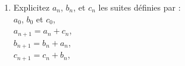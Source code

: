 \documentclass[a4paper,11pt]{book}
\begin{document}
\begin{enumerate}
De m\^eme :\\
$b_n=\frac{1}{3}(2^n(a_0+b_0+c_0)+(-1)^n(2b_0-c_0-a_0)$\\ 
$c_n=\frac{1}{3}(2^n(a_0+b_0+c_0)+(-1)^n(2c_0-b_0-a_0)$\\ 
On v\'erifie, on tape :\\
{\tt seqsolve([b+c,c+a,a+b],[a,b,c,n],[a0,b0,c0])}\\
On obtient apr\`es avoir fait agir la commande {\tt factor} :\\
{\tt [((-b0-c0+2*a0)*(-1)\verb|^|n+2\verb|^|n*(b0+c0+a0))/3,
((-a0-c0+2*b0)*(-1)\verb|^|n+2\verb|^|n*(a0+c0+b0))/3,((-a0-b0+2*c0)*(-1)\verb|^|n+2\verb|^|n(a0+b0+c0))/3]}
\item
Explicitez $a_n$, $b_n$, et $c_n$ les suites d\'efinies par :\\
$a_0$, $b_0$ et $c_0$,\\
$a_{n+1}=a_n+c_n$,\\
$b_{n+1}=b_n+a_n$,\\
$c_{n+1}=c_n+b_n$,\\


\end{enumerate}
\end{document}
